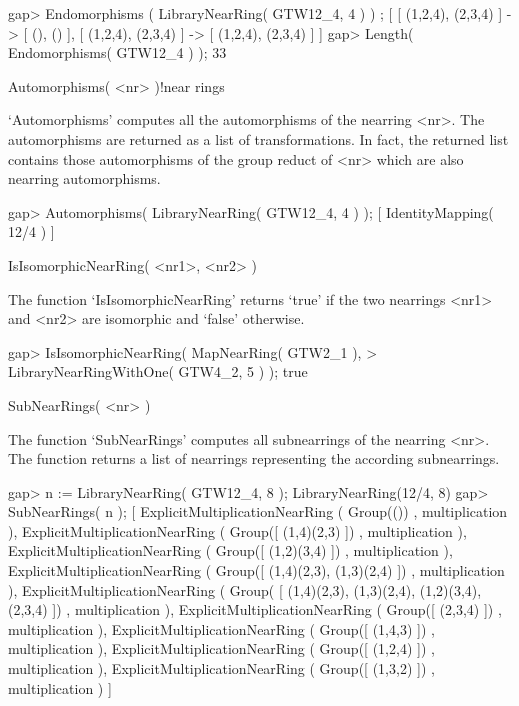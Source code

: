 \beginexample
    gap> Endomorphisms ( LibraryNearRing( GTW12_4, 4 ) ) ;
    [ [ (1,2,4), (2,3,4) ] -> [ (), () ], 
      [ (1,2,4), (2,3,4) ] -> [ (1,2,4), (2,3,4) ] ]
    gap> Length( Endomorphisms( GTW12_4 ) );
    33
\endexample



\>Automorphisms( <nr> )!{near rings}

`Automorphisms' computes all the automorphisms of the nearring <nr>. 
The automorphisms are returned as a list of transformations. In fact, the
returned list contains those automorphisms of the group reduct of <nr>
which are also nearring automorphisms.

\beginexample
    gap> Automorphisms( LibraryNearRing( GTW12_4, 4 ) );
    [ IdentityMapping( 12/4 ) ]
\endexample



\>IsIsomorphicNearRing( <nr1>, <nr2> )

The function `IsIsomorphicNearRing' returns `true' if the two nearrings
<nr1> and <nr2> are isomorphic and `false' otherwise.

\beginexample
    gap> IsIsomorphicNearRing( MapNearRing( GTW2_1 ),                       
    > LibraryNearRingWithOne( GTW4_2, 5 ) );
    true
\endexample



\>SubNearRings( <nr> )

The function `SubNearRings' computes all subnearrings of the nearring 
<nr>. The function returns a list of nearrings representing the 
according subnearrings.

\beginexample
    gap> n := LibraryNearRing( GTW12_4, 8 );            
    LibraryNearRing(12/4, 8)
    gap> SubNearRings( n );
    [ ExplicitMultiplicationNearRing ( Group(()) , multiplication ), 
      ExplicitMultiplicationNearRing ( Group([ (1,4)(2,3) ]) , multiplication ),
      ExplicitMultiplicationNearRing ( Group([ (1,2)(3,4) ]) , multiplication ),
      ExplicitMultiplicationNearRing ( Group([ (1,4)(2,3), (1,3)(2,4) 
         ]) , multiplication ), ExplicitMultiplicationNearRing ( Group(
        [ (1,4)(2,3), (1,3)(2,4), (1,2)(3,4), (2,3,4) ]) , multiplication ), 
      ExplicitMultiplicationNearRing ( Group([ (2,3,4) ]) , multiplication ), 
      ExplicitMultiplicationNearRing ( Group([ (1,4,3) ]) , multiplication ), 
      ExplicitMultiplicationNearRing ( Group([ (1,2,4) ]) , multiplication ), 
      ExplicitMultiplicationNearRing ( Group([ (1,3,2) ]) , multiplication ) ]
\endexample

